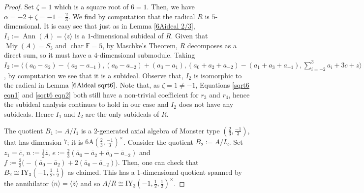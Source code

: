 \documentclass[11pt, a4paper]{article}
\theoremstyle{plain}
\theoremstyle{definition}
\newcommand\al{\alpha}
\newcommand\la{\langle}
\newcommand\ra{\rangle}
\DeclareMathOperator{\ch}{char}
\DeclareMathOperator{\Ann}{Ann}
\newcommand\FF{\mathbb{F}}
\newcommand{\A}{\mathrm{A}}
\newcommand{\IY}{\mathrm{IY}}
\DeclareMathOperator{\Miy}{Miy}
\newcommand{\0}{\overline{0}}
\newcommand{\2}{\overline{2}}
\newcommand{\1}{\mathbbm{1}}
\begin{document}
\begin{proof}
Set $\zeta = 1$ which is a square root of $6 = 1$.  Then, we have $\al = -2+\zeta = -1 = \frac{2}{3}$. We find by computation that the radical $R$ is $5$-dimensional. It is easy see that just as in Lemma \ref{6Aideal 2/3}, $I_1:=\Ann(A) = \la z \ra$ is a $1$-dimensional subideal of $R$.  Given that $\Miy(A) = S_3$ and $\ch \FF = 5$, by Maschke's Theorem, $R$ decomposes as a direct sum, so it must have a $4$-dimensional submodule. Taking $I_2 := \la (a_0 -a_2)-(a_3-a_{-1}), (a_0-a_{-2}) + (a_3-a_1), (a_0+a_2+a_{-2})-(a_1+a_3+a_{-1}),\sum_{i=-2}^{3}a_i +3c +z \ra $, by computation we see that it is a subideal. Observe that, $I_2$ is isomorphic to the radical in Lemma $\ref{6Aideal sqrt6}$.  Note that, as $\zeta = 1 \neq -1$, Equations \eqref{sqrt6 eqn1} and \eqref{sqrt6 eqn2} both still have a non-trivial coefficient for $r_3$ and $r_4$, hence the subideal analysis continues to hold in our case and $I_2$ does not have any subideals. Hence $I_1$ and $I_2$ are the only subideals of $R$.
	
	The quotient $B_1 := A/I_1$ is a $2$-generated axial algebra of Monster type $(\frac{2}{3},\frac{-1}{3})$, that has dimension $7$; it is $6\A(\frac{2}{3},\frac{-1}{3})^\times$.  Consider the quotient $B_2 := A/I_2$.  Set $z_1 = \bar{c}$, $n := \frac{1}{2} \bar{z}$, $e := \frac{2}{3}(\bar{a}_0 - \bar{a}_2 + \bar{a}_0 - \bar{a}_{-2})$ and $f := \frac{2}{3}\big( -(\bar{a}_0 - \bar{a}_2) + 2(\bar{a}_0 - \bar{a}_{-2})\big)$.  Then, one can check that $B_2 \cong \IY_3(-1, \frac{1}{2}, \frac{1}{2})$ as claimed.  This has a $1$-dimensional quotient spanned by the annihilator $\la n \ra = \la \bar{z} \ra$ and so $A/R \cong \IY_3(-1, \frac{1}{2}, \frac{1}{2})^\times$.
\end{proof}
\end{document}
